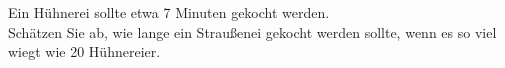 \begin{Exercise}[label = Straußenei, origin = {4. Runde zur 43. IPhO 2012}, title = Straußenei, difficulty = 2]
Ein Hühnerei sollte etwa 7 Minuten gekocht werden.\\
Schätzen Sie ab, wie lange ein Straußenei gekocht werden sollte, wenn es so viel wiegt wie 20 Hühnereier.
\end{Exercise}

